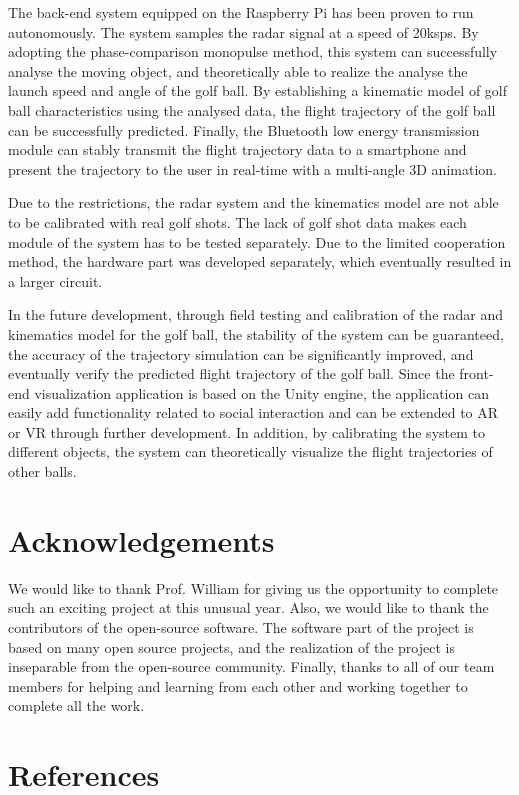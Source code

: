The back-end system equipped on the Raspberry Pi has been proven to run autonomously. The system samples the radar signal at a speed of 20ksps. By adopting the phase-comparison monopulse method, this system can successfully analyse the moving object, and theoretically able to realize the analyse the launch speed and angle of the golf ball.
By establishing a kinematic model of golf ball characteristics using the analysed data, the flight trajectory of the golf ball can be successfully predicted. Finally, the Bluetooth low energy transmission module can stably transmit the flight trajectory data to a smartphone and present the trajectory to the user in real-time with a multi-angle 3D animation.

Due to the restrictions, the radar system and the kinematics model are not able to be calibrated with real golf shots. The lack of golf shot data makes each module of the system has to be tested separately. Due to the limited cooperation method, the hardware part was developed separately, which eventually resulted in a larger circuit.

In the future development, through field testing and calibration of the radar and kinematics model for the golf ball, the stability of the system can be guaranteed, the accuracy of the trajectory simulation can be significantly improved, and eventually verify the predicted flight trajectory of the golf ball. Since the front-end visualization application is based on the Unity engine, the application can easily add functionality related to social interaction and can be extended to AR or VR through further development. In addition, by calibrating the system to different objects, the system can theoretically visualize the flight trajectories of other balls.

\section{Acknowledgements}
We would like to thank Prof. William for giving us the opportunity to complete such an exciting project at this unusual year. Also, we would like to thank the contributors of the open-source software. The software part of the project is based on many open source projects, and the realization of the project is inseparable from the open-source community. Finally, thanks to all of our team members for helping and learning from each other and working together to complete all the work.

\newpage
\section{References}
\printbibliography[heading=none]


